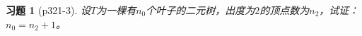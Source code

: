 \documentclass{article}
\begin{document}
\begin{CJK}{UTF8}{gbsn}
  \newtheorem*{Exercise}{习题}
  \huge
\begin{Exercise}[p321-3]
  设$T$为一棵有$n_0$个叶子的二元树，出度为$2$的顶点数为$n_2$，试证：$n_0=n_2+1$。
\end{Exercise}

\end{CJK}
\end{document}

